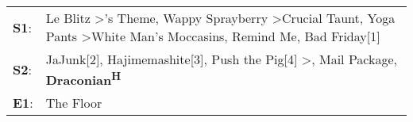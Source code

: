 \begin{supertabular}{p{0.03\textwidth}p{0.92\textwidth}}
 \textbf{S1}:  &  Le Blitz\textsuperscript{} \textgreater {}'s Theme\textsuperscript{}, \enspace Wappy Sprayberry\textsuperscript{} \textgreater \enspace Crucial Taunt\textsuperscript{}, \enspace Yoga Pants\textsuperscript{} \textgreater \enspace White Man's Moccasins\textsuperscript{}, \enspace Remind Me\textsuperscript{}, \enspace Bad Friday[1]\textsuperscript{}  \enspace  \\
 \textbf{S2}:  &                                                                                                             JaJunk[2]\textsuperscript{}, \enspace Hajimemashite[3]\textsuperscript{}, \enspace Push the Pig[4]\textsuperscript{} \textgreater {}\textsuperscript{}, \enspace Mail Package\textsuperscript{}, \enspace \textbf{Draconian\textsuperscript{H}}  \enspace  \\
 \textbf{E1}:  &                                                                                                                                                                                                                                                                                                                                            The Floor\textsuperscript{}  \enspace  \\
\end{supertabular}
